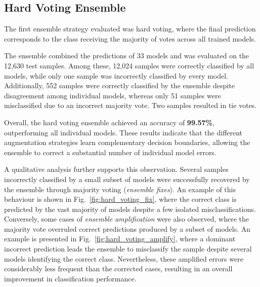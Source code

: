 \documentclass[conference]{IEEEtran}
\begin{document}
\subsection{Hard Voting Ensemble}

The first ensemble strategy evaluated was hard voting, where the final prediction corresponds to the class receiving the majority of votes across all trained models.

The ensemble combined the predictions of 33 models and was evaluated on the 12,630 test samples. Among these, 12,024 samples were correctly classified by all models, while only one sample was incorrectly classified by every model. Additionally, 552 samples were correctly classified by the ensemble despite disagreement among individual models, whereas only 51 samples were misclassified due to an incorrect majority vote. Two samples resulted in tie votes.

Overall, the hard voting ensemble achieved an accuracy of \textbf{99.57\%}, outperforming all individual models. These results indicate that the different augmentation strategies learn complementary decision boundaries, allowing the ensemble to correct a substantial number of individual model errors.


A qualitative analysis further supports this observation. Several samples incorrectly classified by a small subset of models were successfully recovered by the ensemble through majority voting (\textit{ensemble fixes}). An example of this behaviour is shown in Fig.~\ref{fig:hard_voting_fix}, where the correct class is predicted by the vast majority of models despite a few isolated misclassifications. Conversely, some cases of \textit{ensemble amplification} were also observed, where the majority vote overruled correct predictions produced by a subset of models. An example is presented in Fig.~\ref{fig:hard_voting_amplify}, where a dominant incorrect prediction leads the ensemble to misclassify the sample despite several models identifying the correct class. Nevertheless, these amplified errors were considerably less frequent than the corrected cases, resulting in an overall improvement in classification performance.
\end{document}
